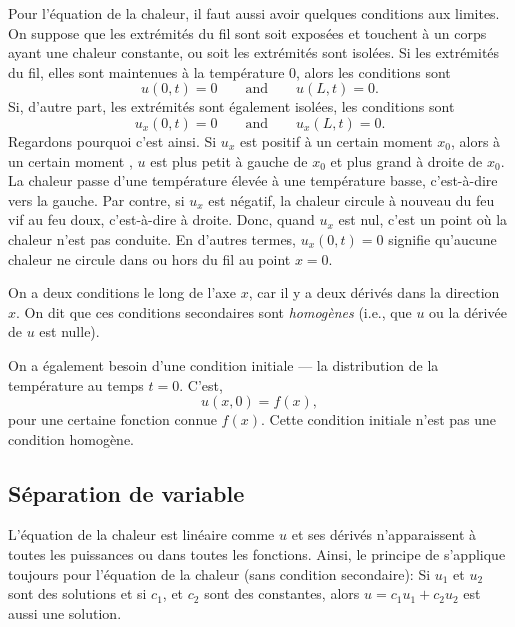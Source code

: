 Pour l'équation de la chaleur, il faut aussi avoir quelques
conditions aux limites.
On suppose que les extrémités du fil sont soit exposées
et touchent à un corps ayant une chaleur constante,  ou  soit les extrémités sont isolées.
Si les extrémités du fil, elles sont maintenues à la température 0, alors
les conditions sont
\begin{equation*}
u(0,t) = 0 \qquad \text{and} \qquad u(L,t) = 0.
\end{equation*}
Si,  d'autre part,  les extrémités sont également isolées,  les conditions sont
\begin{equation*}
u_x(0,t) = 0 \qquad \text{and} \qquad
u_x(L,t) = 0 .
\end{equation*}
Regardons pourquoi c'est ainsi.
Si $ u_x $ est positif à un certain moment $ x_0 $,  alors à un certain moment ,
$ u $ est plus petit à gauche de $ x_0 $ et plus grand à droite de $ x_0 $.
La chaleur passe d'une température élevée à une température basse, c'est-à-dire vers la gauche.
Par contre,  si $ u_x $ est négatif, la chaleur circule à nouveau
du feu vif au feu doux, c'est-à-dire à droite.  Donc,  quand $ u_x $ est nul,  c'est un point où la chaleur n'est pas conduite.  En d'autres termes, $ u_x (0, t) = 0 $ signifie qu'aucune chaleur ne circule dans ou hors du fil au point $ x = 0 $.

On a deux conditions le long de l'axe $ x $, car il y a
deux dérivés dans la direction $ x $.
On dit que ces conditions secondaires sont
\emph{homogènes }
(i.e.,  que $u$ ou la dérivée de $u$ est nulle).

On a également besoin d'une condition initiale --- la distribution de la température
au temps $ t = 0 $.  C'est,
\begin{equation*}
u(x,0) = f(x) ,
\end{equation*}
pour une certaine fonction connue $ f (x) $.
Cette condition initiale n'est pas une condition homogène.

\subsection{Séparation de variable}

L'équation de la chaleur est linéaire comme $ u $ et ses dérivés n'apparaissent à toutes les puissances ou dans toutes les fonctions.
Ainsi,  le principe de  s'applique toujours pour
l'équation de la chaleur
(sans condition secondaire):
Si $ u_1 $ et $ u_2 $ sont des
solutions et si $ c_1 $, et $ c_2 $ sont des constantes,  alors
$ u = c_1 u_1 + c_2 u_2 $ est aussi une solution.

